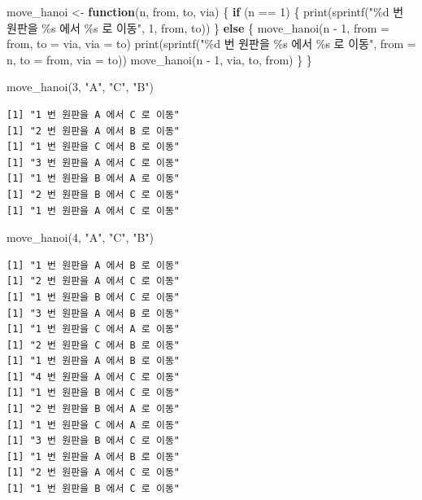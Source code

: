 \documentclass[
  11pt,
]{krantz}
\newenvironment{Shaded}{\begin{snugshade}}{\end{snugshade}}
\newcommand{\AttributeTok}[1]{\textcolor[rgb]{0.61,0.61,0.61}{#1}}
\newcommand{\ControlFlowTok}[1]{\textcolor[rgb]{0.27,0.27,0.27}{\textbf{#1}}}
\newcommand{\DecValTok}[1]{\textcolor[rgb]{0.06,0.06,0.06}{#1}}
\newcommand{\FunctionTok}[1]{\textcolor[rgb]{0,0,0}{#1}}
\newcommand{\NormalTok}[1]{#1}
\newcommand{\OtherTok}[1]{\textcolor[rgb]{0.37,0.37,0.37}{#1}}
\newcommand{\SpecialCharTok}[1]{\textcolor[rgb]{0,0,0}{#1}}
\newcommand{\StringTok}[1]{\textcolor[rgb]{0.5,0.5,0.5}{#1}}
\begin{document}
\begin{Shaded}
\begin{Highlighting}[]
\NormalTok{move\_hanoi }\OtherTok{\textless{}{-}} \ControlFlowTok{function}\NormalTok{(n, from, to, via) \{}
 \ControlFlowTok{if}\NormalTok{ (n }\SpecialCharTok{==} \DecValTok{1}\NormalTok{) \{}
   \FunctionTok{print}\NormalTok{(}\FunctionTok{sprintf}\NormalTok{(}\StringTok{"\%d 번 원판을 \%s 에서 \%s 로 이동"}\NormalTok{, }\DecValTok{1}\NormalTok{, from, to))}
\NormalTok{ \} }\ControlFlowTok{else}\NormalTok{ \{}
   \FunctionTok{move\_hanoi}\NormalTok{(n }\SpecialCharTok{{-}} \DecValTok{1}\NormalTok{, }\AttributeTok{from =}\NormalTok{ from, }\AttributeTok{to =}\NormalTok{ via, }\AttributeTok{via =}\NormalTok{ to)}
   \FunctionTok{print}\NormalTok{(}\FunctionTok{sprintf}\NormalTok{(}\StringTok{"\%d 번 원판을 \%s 에서 \%s 로 이동"}\NormalTok{, }
                 \AttributeTok{from =}\NormalTok{ n, }
                 \AttributeTok{to =}\NormalTok{ from, }
                 \AttributeTok{via =}\NormalTok{ to))}
   \FunctionTok{move\_hanoi}\NormalTok{(n }\SpecialCharTok{{-}} \DecValTok{1}\NormalTok{, via, to, from)}
\NormalTok{ \}}
\NormalTok{\}}


\FunctionTok{move\_hanoi}\NormalTok{(}\DecValTok{3}\NormalTok{, }\StringTok{"A"}\NormalTok{, }\StringTok{"C"}\NormalTok{, }\StringTok{"B"}\NormalTok{)}
\end{Highlighting}
\end{Shaded}

\begin{verbatim}
[1] "1 번 원판을 A 에서 C 로 이동"
[1] "2 번 원판을 A 에서 B 로 이동"
[1] "1 번 원판을 C 에서 B 로 이동"
[1] "3 번 원판을 A 에서 C 로 이동"
[1] "1 번 원판을 B 에서 A 로 이동"
[1] "2 번 원판을 B 에서 C 로 이동"
[1] "1 번 원판을 A 에서 C 로 이동"
\end{verbatim}

\begin{Shaded}
\begin{Highlighting}[]
\FunctionTok{move\_hanoi}\NormalTok{(}\DecValTok{4}\NormalTok{, }\StringTok{"A"}\NormalTok{, }\StringTok{"C"}\NormalTok{, }\StringTok{"B"}\NormalTok{)}
\end{Highlighting}
\end{Shaded}

\begin{verbatim}
[1] "1 번 원판을 A 에서 B 로 이동"
[1] "2 번 원판을 A 에서 C 로 이동"
[1] "1 번 원판을 B 에서 C 로 이동"
[1] "3 번 원판을 A 에서 B 로 이동"
[1] "1 번 원판을 C 에서 A 로 이동"
[1] "2 번 원판을 C 에서 B 로 이동"
[1] "1 번 원판을 A 에서 B 로 이동"
[1] "4 번 원판을 A 에서 C 로 이동"
[1] "1 번 원판을 B 에서 C 로 이동"
[1] "2 번 원판을 B 에서 A 로 이동"
[1] "1 번 원판을 C 에서 A 로 이동"
[1] "3 번 원판을 B 에서 C 로 이동"
[1] "1 번 원판을 A 에서 B 로 이동"
[1] "2 번 원판을 A 에서 C 로 이동"
[1] "1 번 원판을 B 에서 C 로 이동"
\end{verbatim}
\end{document}
